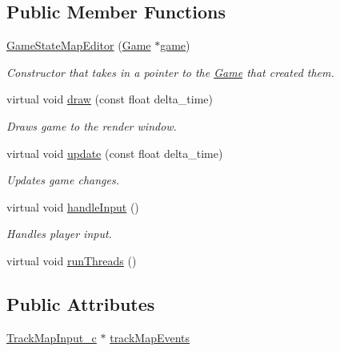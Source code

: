 \subsection*{Public Member Functions}
\begin{DoxyCompactItemize}
\item 
\hyperlink{class_game_state_map_editor_a621caf097a99b645b29729ac5bff3426}{Game\+State\+Map\+Editor} (\hyperlink{class_game}{Game} $\ast$\hyperlink{class_game_state_a355a79415b9ef63c2aec1448a99f6e71}{game})
\begin{DoxyCompactList}\small\item\em Constructor that takes in a pointer to the \hyperlink{class_game}{Game} that created them. \end{DoxyCompactList}\item 
virtual void \hyperlink{class_game_state_map_editor_a37c87643309459ac32d0b5f608bc93b0}{draw} (const float delta\+\_\+time)
\begin{DoxyCompactList}\small\item\em Draws game to the render window. \end{DoxyCompactList}\item 
virtual void \hyperlink{class_game_state_map_editor_afc6fb92c082c138e86f295b99aad2ddf}{update} (const float delta\+\_\+time)
\begin{DoxyCompactList}\small\item\em Updates game changes. \end{DoxyCompactList}\item 
virtual void \hyperlink{class_game_state_map_editor_ad8bd50d8a9823c26a57d315a6b303b88}{handle\+Input} ()
\begin{DoxyCompactList}\small\item\em Handles player input. \end{DoxyCompactList}\item 
virtual void \hyperlink{class_game_state_map_editor_a82ca3024c962b254ebdedcaa6ce5c1a8}{run\+Threads} ()
\end{DoxyCompactItemize}
\subsection*{Public Attributes}
\begin{DoxyCompactItemize}
\item 
\hyperlink{class_track_map_input__c}{Track\+Map\+Input\+\_\+c} $\ast$ \hyperlink{class_game_state_map_editor_a8a2f5da5eb2539b7ecb05298fda98ba1}{track\+Map\+Events}
\end{DoxyCompactItemize}
